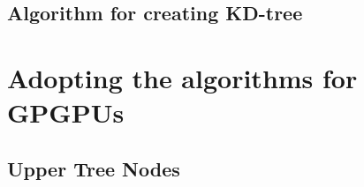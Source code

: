 






\subsection{Algorithm for creating KD-tree}




\section{Adopting the algorithms for GPGPUs}





\subsection{Upper Tree Nodes}





